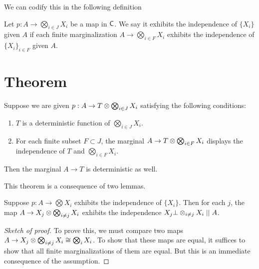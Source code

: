 \documentclass[11pt]{article}
\begin{document}
We can codify this in the following definition
\begin{definition}
    Let $p: A \to \bigotimes_{i\in J}X_i$ be a map in $\mathsf{C}$.
    We say it exhibits the independence of $\{X_i\}$ given $A$ if each finite marginalization $A \to \bigotimes_{i \in F}X_i$ exhibits the independence of $\{X_i\}_{i \in F}$ given $A$.
\end{definition}

\section{Theorem}
\begin{theorem}
    \label{thm:kolmog}
    Suppose we are given $p: A \to T \otimes \bigotimes_{i \in J} X_i$ satisfying the following conditions:
    \begin{enumerate}
        \item $T$ is a deterministic function of $\bigotimes_{i \in J} X_i$.
        \item For each finite subset $F \subset J$, the marginal $A \to T \otimes \bigotimes_{i \in F}X_i$ displays the independence of $T$ and $\bigotimes_{i \in F} X_i$.
    \end{enumerate}
    Then the marginal $A \to T$ is deterministic as well.
\end{theorem}

This theorem is a consequence of two lemmas.
\begin{lemma}
    Suppose $p: A \to \bigotimes X_i$ exhibits the independence of $\{X_i\}$.
    Then for each $j$, the map $A \to X_j \otimes \bigotimes_{i \neq j}X_i$ exhibits the independence $X_j \bot \otimes_{i\neq j} X_i \mid \mid A$.
\end{lemma}
\begin{proof}[Sketch of proof]
    To prove this, we must compare two maps $A \to X_j \otimes \bigotimes_{i\neq j} X_i \cong \bigotimes_i X_i$.
    To show that these maps are equal, it suffices to show that all finite marginalizations of them are equal.
    But this is an immediate consequence of the assumption.
\end{proof}
\end{document}
